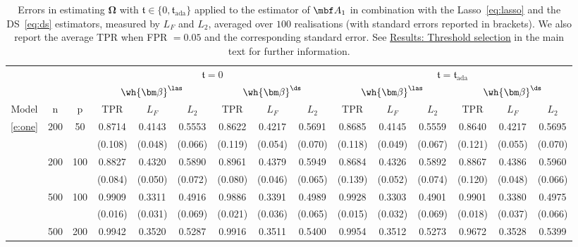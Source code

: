\begin{table}[htb!]
\caption{Errors in estimating $\bm\Omega$ with $\mathfrak{t} \in \{0, \mathfrak{t}_{\text{ada}}\}$ applied to the estimator of $\mbf A_1$ in combination with the Lasso~\eqref{eq:lasso} and the DS~\eqref{eq:ds} estimators, measured by $L_F$ and $L_2$, averaged over $100$ realisations (with standard errors reported in brackets). 
We also report the average TPR when FPR $= 0.05$ and the corresponding standard error.
See \hyperref[sec:sim:order]{Results: Threshold selection} in the main text for further information.} 
\label{table:thresholdomega}
\centering
\resizebox{\columnwidth}{!}
{\scriptsize 
\begin{tabular}{ccc cccccc cccccc}
\toprule 
 &  &  & \multicolumn{6}{c}{$\mathfrak{t} = 0$} &  \multicolumn{6}{c}{$\mathfrak{t}=\mathfrak{t}_{\text{ada}}$} \\
 \cmidrule(lr){4-9}\cmidrule(lr){10-15}
 &  &  & \multicolumn{3}{c}{$\wh{\bm\beta}^{\las}$} & \multicolumn{3}{c}{$\wh{\bm\beta}^{\ds}$} & \multicolumn{3}{c}{$\wh{\bm\beta}^{\las}$} & \multicolumn{3}{c}{$\wh{\bm\beta}^{\ds}$}   \\
 \cmidrule(lr){4-6}\cmidrule(lr){7-9} \cmidrule(lr){10-12} \cmidrule(lr){13-15}
Model & n & p & TPR & $L_F$ & $L_2$ & TPR & $L_F$ & $L_2$ & TPR & $L_F$ & $L_2$ & TPR & $L_F$ & $L_2$ \\
\cmidrule(lr){1-3}\cmidrule(lr){4-9} \cmidrule(lr){10-15}
\ref{e:one} & 200 & 50 & 0.8714 & 0.4143 & 0.5553 & 0.8622 & 0.4217 & 0.5691 & 0.8685 & 0.4145 & 0.5559 & 0.8640 & 0.4217 & 0.5695 \\
 &  &  & (0.108) & (0.048) & (0.066) & (0.119) & (0.054) & (0.070) & (0.118) & (0.049) & (0.067) & (0.121) & (0.055) & (0.070) \\
 & 200 & 100 & 0.8827 & 0.4320 & 0.5890 & 0.8961 & 0.4379 & 0.5949 & 0.8684 & 0.4326 & 0.5892 & 0.8867 & 0.4386 & 0.5960 \\
 &  &  & (0.084) & (0.050) & (0.072) & (0.080) & (0.046) & (0.065) & (0.139) & (0.052) & (0.074) & (0.120) & (0.048) & (0.066) \\
 & 500 & 100 & 0.9909 & 0.3311 & 0.4916 & 0.9886 & 0.3391 & 0.4989 & 0.9928 & 0.3303 & 0.4901 & 0.9901 & 0.3380 & 0.4975 \\
 &  &  & (0.016) & (0.031) & (0.069) & (0.021) & (0.036) & (0.065) & (0.015) & (0.032) & (0.069) & (0.018) & (0.037) & (0.066) \\
 & 500 & 200 & 0.9942 & 0.3520 & 0.5287 & 0.9916 & 0.3511 & 0.5400 & 0.9954 & 0.3512 & 0.5273 & 0.9672 & 0.3528 & 0.5399 \\

\end{tabular}}
\end{table}
